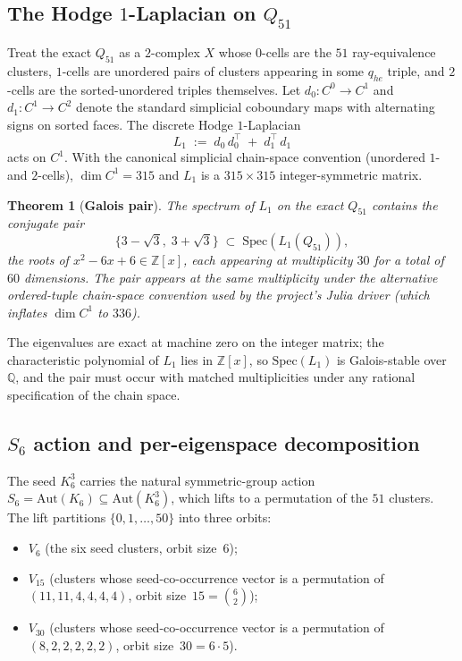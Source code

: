 \documentclass[12pt,a4paper]{article}
\newtheorem{theorem}{Theorem}[section]
\theoremstyle{definition}
\theoremstyle{remark}
\newcommand{\bZ}{\mathbb{Z}}
\newcommand{\bQ}{\mathbb{Q}}                %
\begin{document}
\subsection{The Hodge $1$-Laplacian on $Q_{51}$}\label{sec:galois-L1}

Treat the exact $Q_{51}$ as a $2$-complex $X$ whose $0$-cells are the
$51$ ray-equivalence clusters, $1$-cells are unordered pairs of
clusters appearing in some $q_{he}$ triple, and $2$-cells are the
sorted-unordered triples themselves. Let $d_0\colon C^0 \to C^1$ and
$d_1\colon C^1 \to C^2$ denote the standard simplicial coboundary
maps with alternating signs on sorted faces. The discrete Hodge
$1$-Laplacian
\[
  L_1 \;:=\; d_0\,d_0^{\!\top} \;+\; d_1^{\!\top}\,d_1
\]
acts on $C^1$. With the canonical simplicial chain-space convention
(unordered $1$- and $2$-cells), $\dim C^1 = 315$ and $L_1$ is a
$315 \times 315$ integer-symmetric matrix.

\begin{theorem}[\textbf{Galois pair}]\label{thm:galois-pair}
The spectrum of $L_1$ on the exact $Q_{51}$ contains the conjugate pair
\[
  \{3-\sqrt 3,\; 3+\sqrt 3\}
  \;\subset\; \mathrm{Spec}(L_1(Q_{51})),
\]
the roots of $x^2 - 6x + 6 \in \bZ[x]$, each appearing at multiplicity
$30$ for a total of $60$ dimensions. The pair appears at the same
multiplicity under the alternative ordered-tuple chain-space
convention used by the project's Julia driver (which inflates
$\dim C^1$ to $336$).
\end{theorem}

The eigenvalues are exact at machine zero on the integer matrix; the
characteristic polynomial of $L_1$ lies in $\bZ[x]$, so $\mathrm{Spec}(L_1)$
is Galois-stable over $\bQ$, and the pair must occur with matched
multiplicities under any rational specification of the chain space.

\subsection{$S_6$ action and per-eigenspace decomposition}\label{sec:galois-s6}

The seed $K_6^3$ carries the natural symmetric-group action
$S_6 = \mathrm{Aut}(K_6) \subseteq \mathrm{Aut}(K_6^3)$, which lifts
to a permutation of the $51$ clusters. The lift partitions
$\{0, 1, \dots, 50\}$ into three orbits:
\begin{itemize}\setlength{\itemsep}{0pt}
\item $V_6$ (the six seed clusters, orbit size~$6$);
\item $V_{15}$ (clusters whose seed-co-occurrence vector is a
  permutation of $(11, 11, 4, 4, 4, 4)$, orbit size~$15 = \binom{6}{2}$);
\item $V_{30}$ (clusters whose seed-co-occurrence vector is a
  permutation of $(8, 2, 2, 2, 2, 2)$, orbit size~$30 = 6 \cdot 5$).
\end{itemize}
\end{document}

